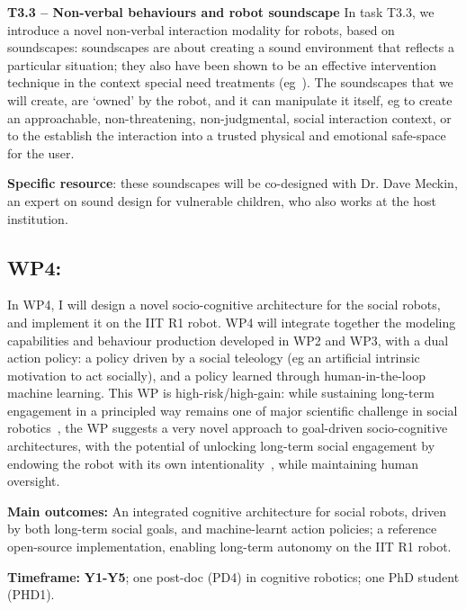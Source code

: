 \documentclass[11pt,a4paper]{report}
\begin{document}
\textbf{T3.3 -- Non-verbal behaviours and robot soundscape} In task T3.3, we
introduce a novel non-verbal interaction modality for robots, based on
soundscapes: soundscapes are about creating a sound environment that reflects a
particular situation; they also have been shown to be an effective intervention
technique in the context special need treatments
(eg~\cite{greher2010soundscape}). The soundscapes that we will create, are
`owned' by the robot, and it can manipulate it itself, eg to create an
approachable, non-threatening, non-judgmental, social interaction context, or to
the establish the interaction into a trusted physical and emotional safe-space
for the user.

\textbf{Specific resource}: these soundscapes will be co-designed with Dr.
Dave Meckin, an expert on sound design for vulnerable children, who also works
at the host institution.

\subsection{WP4: \textbf{\wpFour}}

In WP4, I will design a novel socio-cognitive architecture for the social
robots, and implement it on the IIT R1 robot.  WP4 will integrate together the
modeling capabilities and behaviour production developed in WP2 and WP3, with a
dual action policy: a policy driven by a social teleology (eg an artificial
intrinsic motivation to act socially), and a policy learned through
human-in-the-loop machine learning. This WP is high-risk/high-gain: while sustaining
long-term engagement in a principled way remains one of major scientific
challenge in social robotics~\cite{hoffman2019anki}, the WP suggests a very novel
approach to goal-driven socio-cognitive architectures, with the potential of
unlocking long-term social engagement by endowing the robot with its own
intentionality~\cite{wiese2017robots}, while maintaining human oversight.

\begin{oframed}
    \textbf{Main outcomes:} An integrated cognitive architecture for social
    robots, driven by both long-term social goals, and machine-learnt action
    policies; a reference open-source implementation, enabling long-term
    autonomy on the IIT R1 robot.

    \textbf{Timeframe:} \textbf{Y1-Y5}; one post-doc (PD4) in cognitive
    robotics; one PhD student (PHD1).

\end{oframed}
\end{document}
